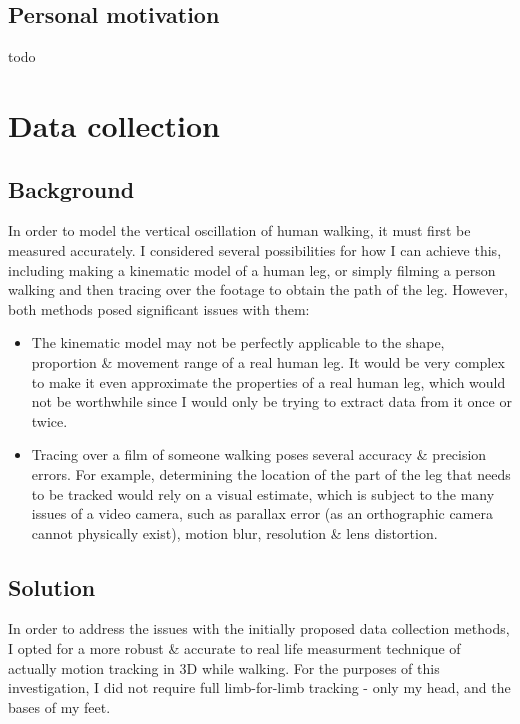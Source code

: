 \documentclass[12pt, a4paper]{article}
\begin{document}
\subsection{Personal motivation}
todo

\section{Data collection}
\subsection{Background}
In order to model the vertical oscillation of human walking, it must first be
measured accurately. I considered several possibilities for how I can achieve
this, including making a kinematic model of a human leg, or simply filming a
person walking and then tracing over the footage to obtain the path of the leg.
However, both methods posed significant issues with them:
\begin{itemize}
    \item The kinematic model may not be perfectly applicable to the shape,
          proportion \& movement range of a real human leg. It would be very
          complex to make it even approximate the properties of a real human
          leg, which would not be worthwhile since I would only be trying to
          extract data from it once or twice.
    \item Tracing over a film of someone walking poses several accuracy \&
          precision errors. For example, determining the location of the part of
          the leg that needs to be tracked would rely on a visual estimate,
          which is subject to the many issues of a video camera, such as
          parallax error (as an orthographic camera cannot physically exist),
          motion blur, resolution \& lens distortion.
\end{itemize}

\subsection{Solution}
In order to address the issues with the initially proposed data collection
methods, I opted for a more robust \& accurate to real life measurment technique
of actually motion tracking in 3D while walking. For the purposes of this
investigation, I did not require full limb-for-limb tracking - only my head, and
the bases of my feet. \\
\end{document}
